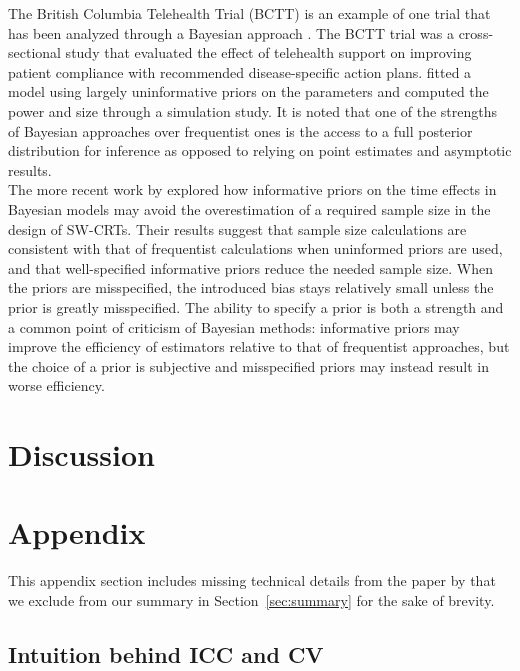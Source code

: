 \documentclass[10pt]{article}
\begin{document}
The British Columbia Telehealth Trial (BCTT) is an example of one trial that has been analyzed through a Bayesian approach \parencite{Cunanan:2016}. The BCTT trial was a cross-sectional study that evaluated the effect of telehealth support on improving patient compliance with recommended disease-specific action plans. \citeauthor{Cunanan:2016} fitted a model using largely uninformative priors on the parameters and computed the power and size through a simulation study. It is noted that one of the strengths of Bayesian approaches over frequentist ones is the access to a full posterior distribution for inference as opposed to relying on point estimates and asymptotic results.
\\

The more recent work by \textcite{Zhan:2021} explored how informative priors on the time effects in Bayesian models may avoid the overestimation of a required sample size in the design of SW-CRTs. Their results suggest that sample size calculations are consistent with that of frequentist calculations when uninformed priors are used, and that well-specified informative priors reduce the needed sample size. When the priors are misspecified, the introduced bias stays relatively small unless the prior is greatly misspecified. The ability to specify a prior is both a strength and a common point of criticism of Bayesian methods: informative priors may improve the efficiency of estimators relative to that of frequentist approaches, but the choice of a prior is subjective and misspecified priors may instead result in worse efficiency.


\section{Discussion} \label{sec:discussion}


\newpage


\printbibliography


\newpage


\appendix
\section{Appendix} \label{apx}

This appendix section includes missing technical details from the paper by \textcite{Hussey:2007} that we exclude from our summary in Section~\ref{sec:summary} for the sake of brevity.

\subsection{Intuition behind ICC and CV} \label{apx:correlation}
\end{document}
